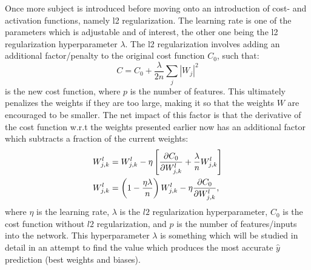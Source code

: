             Once more subject is introduced before moving onto an introduction of cost- and activation functions, namely l2 regularization. The learning rate is one of the parameters which is adjustable and of interest, the other one being the l2 regularization hyperparameter $\lambda$. The l2 regularization involves adding an additional factor/penalty to the original cost function $C_0$, such that:
            \begin{equation}
                C = C_0 + \frac{\lambda}{2n} \sum_j |W_j|^2
            \end{equation}{}
            is the new cost function, where $p$ is the number of features. This ultimately penalizes the weights if they are too large, making it so that the weights $W$ are encouraged to be smaller. The net impact of this factor is that the derivative of the cost function w.r.t the weights presented earlier now has an additional factor which subtracts a fraction of the current weights:
            \begin{align}
                W^l_{j,k} &= W^l_{j,k} - \eta\left[ \pdv{C_0}{W^l_{j,k}} + \frac{\lambda}{n} W^l_{j,k} \right]\\
                W^l_{j,k} &= \left(1-\frac{\eta\lambda}{n}\right)W^l_{j,k} - \eta \pdv{C_0}{W^l_{j,k}},
            \end{align}
            where $\eta$ is the learning rate, $\lambda$ is the $l2$ regularization hyperparameter, $C_0$ is the cost function without $l2$ regularization, and $p$ is the number of features/inputs into the network. This hyperparameter $\lambda$ is something which will be studied in detail in an attempt to find the value which produces the most accurate $\hat{y}$ prediction (best weights and biases).
            
